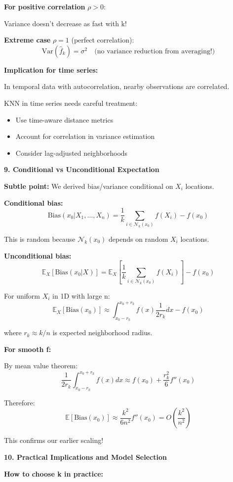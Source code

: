 \documentclass[12pt]{article}
\begin{document}
\begin{explanation}
\textbf{For positive correlation } $\rho > 0$:

Variance doesn't decrease as fast with k!

\textbf{Extreme case } $\rho = 1$ (perfect correlation):
\[
\text{Var}(\hat{f}_k) = \sigma^2 \quad \text{(no variance reduction from averaging!)}
\]

\textbf{Implication for time series:}

In temporal data with autocorrelation, nearby observations are correlated.

KNN in time series needs careful treatment:
\begin{itemize}
    \item Use time-aware distance metrics
    \item Account for correlation in variance estimation
    \item Consider lag-adjusted neighborhoods
\end{itemize}

\textbf{9. Conditional vs Unconditional Expectation}

\textbf{Subtle point:} We derived bias/variance conditional on $X_i$ locations.

\textbf{Conditional bias:}
\[
\text{Bias}(x_0 | X_1, \ldots, X_n) = \frac{1}{k}\sum_{i \in \mathcal{N}_k(x_0)} f(X_i) - f(x_0)
\]

This is random because $\mathcal{N}_k(x_0)$ depends on random $X_i$ locations.

\textbf{Unconditional bias:}
\[
\mathbb{E}_{X}[\text{Bias}(x_0 | X)] = \mathbb{E}_X\left[\frac{1}{k}\sum_{i \in \mathcal{N}_k(x_0)} f(X_i)\right] - f(x_0)
\]

For uniform $X_i$ in 1D with large n:
\[
\mathbb{E}_X[\text{Bias}(x_0)] \approx \int_{x_0 - r_k}^{x_0 + r_k} f(x)\frac{1}{2r_k}dx - f(x_0)
\]

where $r_k \approx k/n$ is expected neighborhood radius.

\textbf{For smooth f:}

By mean value theorem:
\[
\frac{1}{2r_k}\int_{x_0 - r_k}^{x_0 + r_k} f(x)dx \approx f(x_0) + \frac{r_k^2}{6}f''(x_0)
\]

Therefore:
\[
\mathbb{E}[\text{Bias}(x_0)] \approx \frac{k^2}{6n^2}f''(x_0) = O\left(\frac{k^2}{n^2}\right)
\]

This confirms our earlier scaling!

\textbf{10. Practical Implications and Model Selection}

\textbf{How to choose k in practice:}


\end{explanation}
\end{document}
